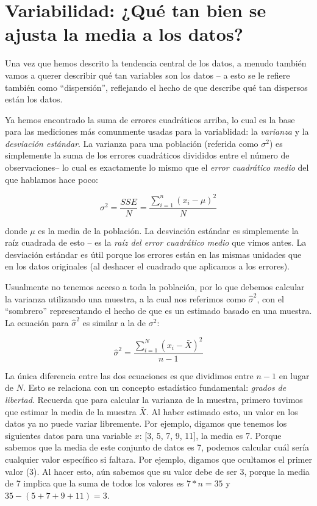 \documentclass[
  12pt,
]{book}
\begin{document}
\hypertarget{variabilidad-quuxe9-tan-bien-se-ajusta-la-media-a-los-datos}{%
\section{Variabilidad: ¿Qué tan bien se ajusta la media a los datos?}\label{variabilidad-quuxe9-tan-bien-se-ajusta-la-media-a-los-datos}}

Una vez que hemos descrito la tendencia central de los datos, a menudo también vamos a querer describir qué tan variables son los datos -- a esto se le refiere también como ``dispersión'', reflejando el hecho de que describe qué tan dispersos están los datos.

Ya hemos encontrado la suma de errores cuadráticos arriba, lo cual es la base para las mediciones más comunmente usadas para la variablidad: la \emph{varianza} y la \emph{desviación estándar}. La varianza para una población (referida como \(\sigma^2\)) es simplemente la suma de los errores cuadráticos divididos entre el número de observaciones-- lo cual es exactamente lo mismo que el \emph{error cuadrático medio} del que hablamos hace poco:

\[
\sigma^2 = \frac{SSE}{N} = \frac{\sum_{i=1}^n (x_i - \mu)^2}{N}
\]

donde \(\mu\) es la media de la población. La desviación estándar es simplemente la raíz cuadrada de esto -- es la \emph{raíz del error cuadrático medio} que vimos antes. La desviación estándar es útil porque los errores están en las mismas unidades que en los datos originales (al deshacer el cuadrado que aplicamos a los errores).

Usualmente no tenemos acceso a toda la población, por lo que debemos calcular la varianza utilizando una muestra, a la cual nos referimos como \(\hat{\sigma}^2\), con el ``sombrero'' representando el hecho de que es un estimado basado en una muestra. La ecuación para \(\hat{\sigma}^2\) es similar a la de \(\sigma^2\):

\[
\hat{\sigma}^2 = \frac{\sum_{i=1}^N (x_i - \bar{X})^2}{n-1}
\]

La única diferencia entre las dos ecuaciones es que dividimos entre \(n - 1\) en lugar de \(N\). Esto se relaciona con un concepto estadístico fundamental: \emph{grados de libertad}. Recuerda que para calcular la varianza de la muestra, primero tuvimos que estimar la media de la muestra \(\bar{X}\). Al haber estimado esto, un valor en los datos ya no puede variar libremente. Por ejemplo, digamos que tenemos los siguientes datos para una variable \(x\): {[}3, 5, 7, 9, 11{]}, la media es 7. Porque sabemos que la media de este conjunto de datos es 7, podemos calcular cuál sería cualquier valor específico si faltara. Por ejemplo, digamos que ocultamos el primer valor (3). Al hacer esto, aún sabemos que su valor debe de ser 3, porque la media de 7 implica que la suma de todos los valores es \(7 * n = 35\) y \(35 - (5 + 7 + 9 + 11) = 3\).
\end{document}
